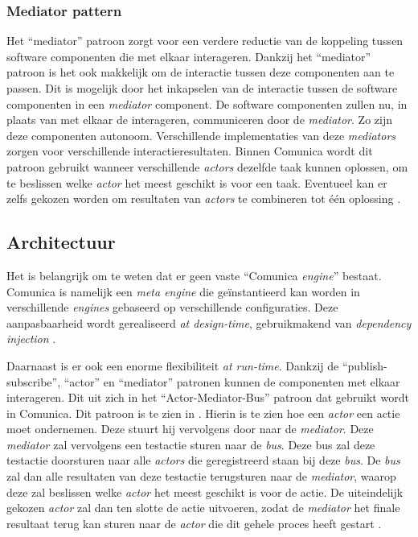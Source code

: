 \subsubsection{Mediator pattern}
Het ``mediator'' patroon zorgt voor een verdere reductie van de koppeling tussen software componenten die met elkaar interageren. Dankzij het ``mediator'' patroon is het ook makkelijk om de interactie tussen deze componenten aan te passen. Dit is mogelijk door het inkapselen van de interactie tussen de software componenten in een \textit{mediator} component. De software componenten zullen nu, in plaats van met elkaar de interageren, communiceren door de \textit{mediator}. Zo zijn deze componenten autonoom. Verschillende implementaties van deze \textit{mediators} zorgen voor verschillende interactieresultaten. Binnen Comunica wordt dit patroon gebruikt wanneer verschillende \textit{actors} dezelfde taak kunnen oplossen, om te beslissen welke \textit{actor} het meest geschikt is voor een taak. Eventueel kan er zelfs gekozen worden om resultaten van \textit{actors} te combineren tot één oplossing \cite{taelman2018comunica}.


\subsection{Architectuur}
Het is belangrijk om te weten dat er geen vaste ``Comunica \textit{engine}'' bestaat. Comunica is namelijk een \textit{meta engine} die geïnstantieerd kan worden in verschillende \textit{engines} gebaseerd op verschillende configuraties. Deze aanpasbaarheid wordt gerealiseerd \textit{at design-time}, gebruikmakend van \textit{dependency injection} \cite{taelman2018comunica}. 

Daarnaast is er ook een enorme flexibiliteit \textit{at run-time}. Dankzij de ``publish-subscribe'', ``actor'' en ``mediator'' patronen kunnen de componenten met elkaar interageren. Dit uit zich in het ``Actor-Mediator-Bus'' patroon dat gebruikt wordt in Comunica. Dit patroon is te zien in . Hierin is te zien hoe een \textit{actor} een actie moet ondernemen. Deze stuurt hij vervolgens door naar de \textit{mediator}. Deze \textit{mediator} zal vervolgens een testactie sturen naar de \textit{bus}. Deze bus zal deze testactie doorsturen naar alle \textit{actors} die geregistreerd staan bij deze \textit{bus}. De \textit{bus} zal dan alle resultaten van deze testactie terugsturen naar de \textit{mediator}, waarop deze zal beslissen welke \textit{actor} het meest geschikt is voor de actie. De uiteindelijk gekozen \textit{actor} zal dan ten slotte de actie uitvoeren, zodat de \textit{mediator} het finale resultaat terug kan sturen naar de \textit{actor} die dit gehele proces heeft gestart \cite{taelman2018comunica}.

